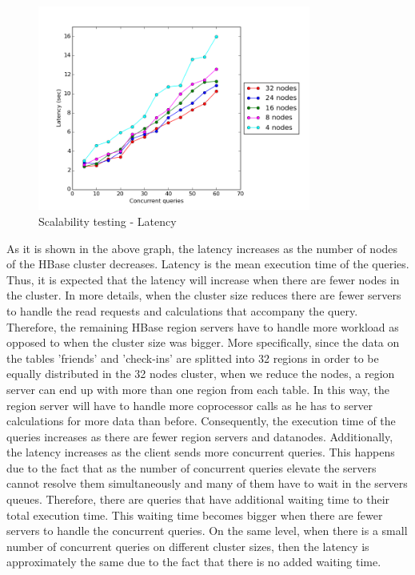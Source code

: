 \begin{figure}[H]
  \centering
  \includegraphics[width=0.8\textwidth]{figures/scalability_latency.png}
  \caption{Scalability testing - Latency}
\end{figure}


As it is shown in the above graph, the latency increases as the number of nodes of the HBase cluster decreases. Latency is the mean execution time of the queries. Thus, 
it is expected that the latency will increase when there are fewer nodes in the cluster. In more details, when the cluster size reduces there are fewer servers to 
handle the read requests and calculations that accompany the query. Therefore, the remaining HBase region servers have to handle more workload as opposed to when 
the cluster size was bigger. More specifically, since the data on the tables 'friends' and 'check-ins' are splitted into 32 regions in order to be equally 
distributed in the 32 nodes cluster, when we reduce the nodes, a region server can end up with more than one region from each table. In this way, the region 
server will have to handle more coprocessor calls as he has to server calculations for more data than before. Consequently, the execution time of the queries 
increases as there are fewer region servers and datanodes. Additionally, the latency increases as the client sends more concurrent queries. This happens due to the fact 
that as the number of concurrent queries elevate the servers cannot resolve them simultaneously and many of them have to wait in the servers queues. Therefore, 
there are queries that have additional waiting time to their total execution time. This waiting time becomes bigger when there are fewer servers to handle the 
concurrent queries. On the same level, when there is a small number of concurrent queries on different cluster sizes, then the latency is approximately the same 
due to the fact that there is no added waiting time. 


